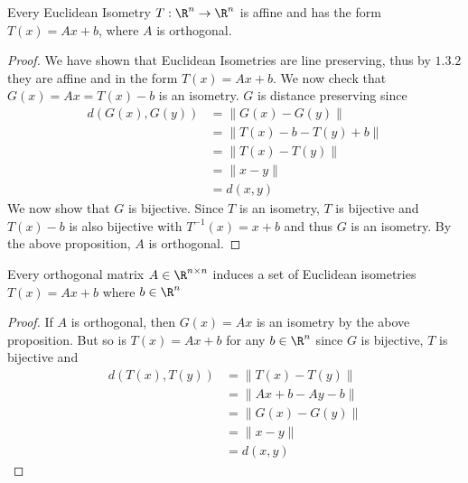 \begin{thm}{}{} Every Euclidean Isometry $T:\R^n\to\R^n$ is affine and has the form $T(x)=Ax+b$, where $A$ is orthogonal. \tcbline
\begin{proof} We have shown that Euclidean Isometries are line preserving, thus by $1.3.2$ they are affine and in the form $T(x)=Ax+b$. We now check that $G(x)=Ax=T(x)-b$ is an isometry. $G$ is distance preserving since
\begin{align*}
d(G(x),G(y))&=\|G(x)-G(y)\|\\
&=\|T(x)-b-T(y)+b\|\\
&=\|T(x)-T(y)\|\\
&=\|x-y\|\tag{$T$ is an isometry}\\
&=d(x,y)
\end{align*}
We now show that $G$ is bijective. Since $T$ is an isometry, $T$ is bijective and $T(x)-b$ is also bijective with $T^{-1}(x)=x+b$ and thus $G$ is an isometry. By the above proposition, $A$ is orthogonal. 
\end{proof}
\end{thm}

\begin{prp}{}{} Every orthogonal matrix $A\in\R^{n\times n}$ induces a set of Euclidean isometries $T(x)=Ax+b$ where $b\in\R^n$ \tcbline
\begin{proof} If $A$ is orthogonal, then $G(x)=Ax$ is an isometry by the above proposition. But so is $T(x)=Ax+b$ for any $b\in\R^n$ since $G$ is bijective, $T$ is bijective and 
\begin{align*}
d(T(x),T(y))&=\|T(x)-T(y)\|\\
&=\|Ax+b-Ay-b\|\\
&=\|G(x)-G(y)\|\\
&=\|x-y\|\tag{$G$ is an isometry}\\
&=d(x,y)
\end{align*}
\end{proof}
\end{prp}

